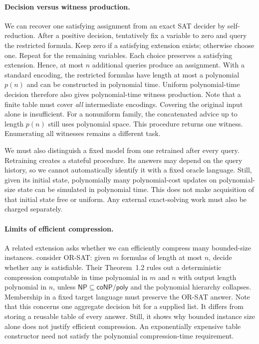 \documentclass[11pt,a4paper]{article}
\numberwithin{equation}{section}
\newcommand{\NPclass}{\mathsf{NP}}
\theoremstyle{plain}
\theoremstyle{definition}
\theoremstyle{remark}
\begin{document}
\paragraph{Decision versus witness production.}
We can recover one satisfying assignment from an exact SAT decider by self-reduction. After a positive decision, tentatively fix a variable to zero and query the restricted formula. Keep zero if a satisfying extension exists; otherwise choose one. Repeat for the remaining variables. Each choice preserves a satisfying extension. Hence, at most $n$ additional queries produce an assignment. With a standard encoding, the restricted formulas have length at most a polynomial $p(n)$ and can be constructed in polynomial time. Uniform polynomial-time decision therefore also gives polynomial-time witness production. Note that a finite table must cover \emph{all} intermediate encodings. Covering the original input alone is insufficient. For a nonuniform family, the concatenated advice up to length $p(n)$ still uses polynomial space. This procedure returns one witness. Enumerating all witnesses remains a different task.

We must also distinguish a fixed model from one retrained after every query. Retraining creates a stateful procedure. Its answers may depend on the query history, so we cannot automatically identify it with a fixed oracle language. Still, given its initial state, polynomially many polynomial-cost updates on polynomial-size state can be simulated in polynomial time. This does not make acquisition of that initial state free or uniform. Any external exact-solving work must also be charged separately.

\paragraph{Limits of efficient compression.}
A related extension asks whether we can efficiently compress many bounded-size instances. \citet{fortnow2011compression} consider OR-SAT: given $m$ formulas of length at most $n$, decide whether any is satisfiable. Their Theorem~1.2 rules out a deterministic compression computable in time polynomial in $m$ and $n$ with output length polynomial in $n$, unless $\NPclass\subseteq\mathsf{coNP/poly}$ and the polynomial hierarchy collapses. Membership in a fixed target language must preserve the OR-SAT answer. Note that this concerns one aggregate decision bit for a supplied list. It differs from storing a reusable table of every answer. Still, it shows why bounded instance size alone does not justify efficient compression. An exponentially expensive table constructor need not satisfy the polynomial compression-time requirement.
\end{document}

